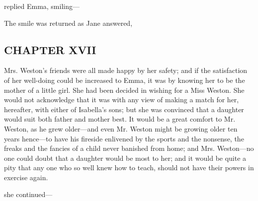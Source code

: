 

 replied Emma, smiling---

The smile was returned as Jane answered,



\subsection[chapter-xvii-2]{\useURL[url55][][][]\from[url55]CHAPTER XVII}

Mrs. Weston's friends were all made happy by her safety; and if the satisfaction of her well-doing could be increased to Emma, it was by knowing her to be the mother of a little girl. She had been decided in wishing for a Miss Weston. She would not acknowledge that it was with any view of making a match for her, hereafter, with either of Isabella's sons; but she was convinced that a daughter would suit both father and mother best. It would be a great comfort to Mr. Weston, as he grew older---and even Mr. Weston might be growing older ten years hence---to have his fireside enlivened by the sports and the nonsense, the freaks and the fancies of a child never banished from home; and Mrs. Weston---no one could doubt that a daughter would be most to her; and it would be quite a pity that any one who so well knew how to teach, should not have their powers in exercise again.

 she continued---

